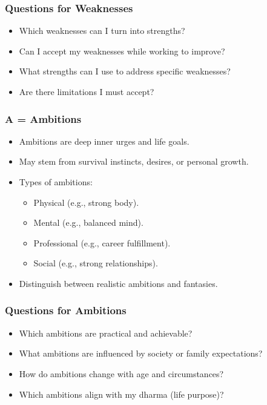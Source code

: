 \begin{frame}[fragile]\frametitle{Questions for Weaknesses}
    \begin{itemize}
        \item Which weaknesses can I turn into strengths?
        \item Can I accept my weaknesses while working to improve?
        \item What strengths can I use to address specific weaknesses?
        \item Are there limitations I must accept?
    \end{itemize}
\end{frame}

\begin{frame}[fragile]\frametitle{A = Ambitions}
    \begin{itemize}
        \item Ambitions are deep inner urges and life goals.
        \item May stem from survival instincts, desires, or personal growth.
        \item Types of ambitions:
        \begin{itemize}
            \item Physical (e.g., strong body).
            \item Mental (e.g., balanced mind).
            \item Professional (e.g., career fulfillment).
            \item Social (e.g., strong relationships).
        \end{itemize}
        \item Distinguish between realistic ambitions and fantasies.
    \end{itemize}
\end{frame}

\begin{frame}[fragile]\frametitle{Questions for Ambitions}
    \begin{itemize}
        \item Which ambitions are practical and achievable?
        \item What ambitions are influenced by society or family expectations?
        \item How do ambitions change with age and circumstances?
        \item Which ambitions align with my dharma (life purpose)?
    \end{itemize}
\end{frame}

